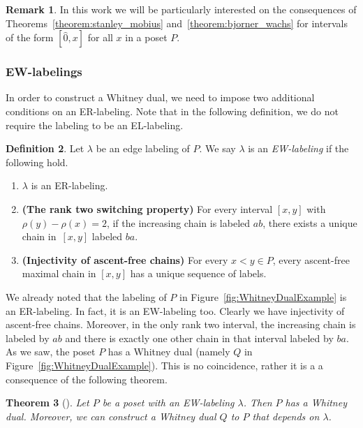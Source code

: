 \documentclass[11pt]{article}
\newtheorem{theo}{Theorem}[section]
\theoremstyle{definition}
\newtheorem{defi}[theo]{Definition}
\newtheorem{rema}[theo]{Remark}
\numberwithin{equation}{section}
\begin{document}
\begin{rema}
   In this work we will be particularly interested on the consequences of Theorems~\ref{theorem:stanley_mobius} and~\ref{theorem:bjorner_wachs} for intervals of the form $[\hat{0},x]$ for all $x$ in a poset $P$.
\end{rema}

\subsubsection{EW-labelings}
In order to construct a Whitney dual, we need to impose two additional conditions on an ER-labeling.   Note that in the following definition, we do not require the labeling to be an EL-labeling.  

 \begin{defi}\label{definition:EW-labeling}
 Let $\lambda$ be an edge labeling of $P$.  We say $\lambda$ is an \emph{EW-labeling} if the following hold.
 \begin{enumerate}
    \item  $\lambda$ is an ER-labeling.
     \item {\bf (The rank two switching property)} For every interval $[x,y]$ with $\rho(y)-\rho(x)=2$, if the increasing chain is labeled $ab$, there exists a unique chain in~$[x,y]$ labeled  $ba$.  
     \item {\bf (Injectivity of ascent-free chains)} For every $x<y\in P$, every ascent-free maximal chain in $[x,y]$ has a unique sequence of labels.
\end{enumerate}
\end{defi}

We already noted that the labeling of  $P$ in Figure~\ref{fig:WhitneyDualExample} is an ER-labeling.     In fact, it is an EW-labeling too.  Clearly we have injectivity of ascent-free chains.     Moreover, in the only rank two interval, the increasing chain is labeled by $ab$ and there is exactly one other chain in that interval labeled by $ba$.  As we saw, the poset $P$ has a Whitney dual (namely $Q$ in Figure~\ref{fig:WhitneyDualExample}).  This is no coincidence, rather it is a a consequence of the following theorem.

\begin{theo}[{\cite[Theorem 1.6]{GonzalezHallam2021}}] 
  Let $P$ be a poset with an EW-labeling $\lambda$. Then $P$ has a Whitney dual. Moreover, we can construct a Whitney dual $Q$ to $P$ that depends on $\lambda$.  
\end{theo}
\end{document}
